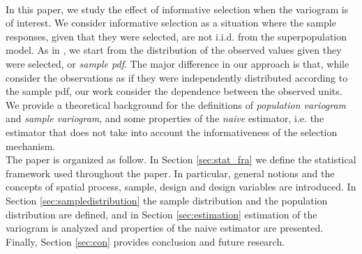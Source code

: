 \\ In this paper, we study the effect of informative selection when the variogram is of interest. We consider informative selection as a situation where the sample responses, given that they were selected, are not i.i.d. from the superpopulation model. As in \cite{pfeffermann1998parametric}, we start from the distribution of the observed values given they were selected, or \emph{sample pdf}. The major difference in our approach is that, while \cite{pfeffermann1998parametric} consider the observations as if they were independently distributed according to the sample pdf, our work consider the dependence between the observed units. We provide a theoretical background for the definitions of \emph{population variogram} and \emph{sample variogram}, and some properties of the \emph{naive} estimator, i.e. the estimator that does not take into account the informativeness of the selection mechanism.
\\The paper is organized as follow. In Section \ref{sec:stat_fra} we define the statistical framework used throughout the paper. In particular, general notions and the concepts of spatial process, sample, design and design variables are introduced. In Section \ref{sec:sampledistribution} the sample distribution and the population distribution are defined, and in Section \ref{sec:estimation} estimation of the variogram is analyzed and properties of the naive estimator are presented. Finally, Section \ref{sec:con} provides conclusion and future research.



